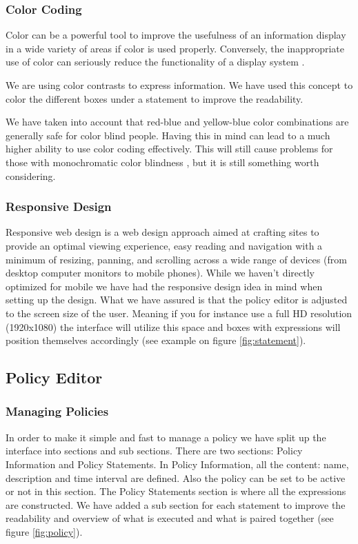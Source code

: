 \subsubsection{Color Coding}
\label{colorcodinglabel}
Color can be a powerful tool to improve the usefulness of an information display in a wide variety of areas if color is used properly. Conversely, the inappropriate use of color can seriously reduce the functionality of a display system \cite{colorcoding}.

We are using color contrasts to express information. We have used this concept to color the different boxes under a statement to improve the readability. 

We have taken into account that red-blue and yellow-blue color combinations are generally safe for color blind people. Having this in mind can lead to a much higher ability to use color coding effectively. This will still cause problems for those with monochromatic color blindness \cite{colorblind}, but it is still something worth considering.

\subsubsection{Responsive Design}
Responsive web design is a web design approach aimed at crafting sites to provide an optimal viewing experience, easy reading and navigation with a minimum of resizing, panning, and scrolling across a wide range of devices (from desktop computer monitors to mobile phones). While we haven't directly optimized for mobile we have had the responsive design idea in mind when setting up the design. What we have assured is that the policy editor is adjusted to the screen size of the user. Meaning if you for instance use a full HD resolution (1920x1080) the interface will utilize this space and boxes with expressions will position themselves accordingly (see example on figure \ref{fig:statement}).

\subsection{Policy Editor}

\subsubsection{Managing Policies}
\label{managing-policies}
In order to make it simple and fast to manage a policy we have split up the interface into sections and sub sections. There are two sections: Policy Information and Policy Statements. In Policy Information, all the content: name, description and time interval are defined. Also the policy can be set to be active or not in this section. The Policy Statements section is where all the expressions are constructed. We have added a sub section for each statement to improve the readability and overview of what is executed and what is paired together (see figure \ref{fig:policy}).  

